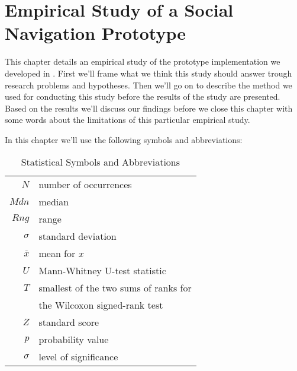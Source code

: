 \chapter{Empirical Study of a Social Navigation Prototype}
\label{chapter:empirical}

This chapter details an empirical study of the prototype implementation we
developed in . First we'll frame what we think this
study should answer trough research problems and hypotheses. Then we'll go on
to describe the method we used for conducting this study before the results of
the study are presented. Based on the results we'll discuss our findings
before we close this chapter with some words about the limitations of this
particular empirical study.

In this chapter we'll use the following symbols and abbreviations:

\begin{table}[!h]
  \begin{tabular}{rl}

  $N$ & number of occurrences \\
  $Mdn$ & median \\
  $Rng$ & range \\
  $\sigma$ & standard deviation \\
  $\overline{x}$ & mean for $x$ \\
  $U$ & Mann-Whitney U-test statistic \\
  $T$ & smallest of the two sums of ranks for \\
      & the Wilcoxon signed-rank test \\
  $Z$ & standard score \\
  $p$ & probability value \\
  $\sigma$ & level of significance \\

  \end{tabular}

  \caption[Statistical Symbols]{Statistical Symbols and Abbreviations}
  \label{table:statistical.symbols}
\end{table}






